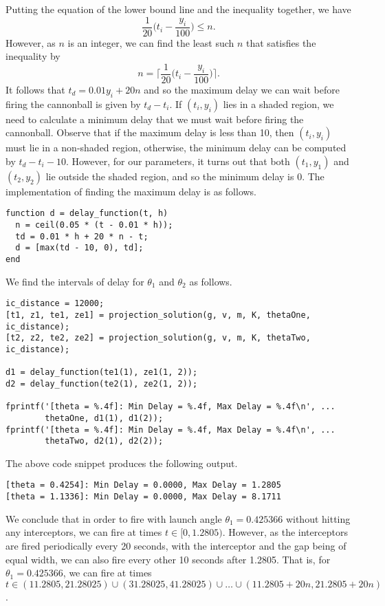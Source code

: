 \noindent
Putting the equation of the lower bound line and the inequality together, we have
$$\frac{1}{20}\Bigg(t_i - \frac{y_i}{100}\Bigg) \leq n.$$
However, as $n$ is an integer, we can find the least such $n$ that satisfies the inequality by 
$$n = \Bigg\lceil \frac{1}{20}\Bigg(t_i - \frac{y_i}{100}\Bigg) \Bigg\rceil.$$
It follows that $t_d = 0.01 y_i + 20n$ and so the maximum delay we can wait before firing the cannonball is given by $t_d - t_i$. If $(t_i, y_i)$ lies in a shaded region, we need to calculate a minimum delay that we must wait before firing the cannonball. Observe that if the maximum delay is less than 10, then $(t_i, y_i)$ must lie in a non-shaded region, otherwise, the minimum delay can be computed by $t_d - t_i - 10$. However, for our parameters, it turns out that both $(t_1, y_1)$ and $(t_2, y_2)$ lie outside the shaded region, and so the minimum delay is 0. The implementation of finding the maximum delay is as follows.

\begin{lstlisting}
function d = delay_function(t, h)
  n = ceil(0.05 * (t - 0.01 * h));
  td = 0.01 * h + 20 * n - t;
  d = [max(td - 10, 0), td];
end
\end{lstlisting}

\newpage
\noindent
We find the intervals of delay for $\theta_1$ and $\theta_2$ as follows.
\begin{lstlisting}
ic_distance = 12000;
[t1, z1, te1, ze1] = projection_solution(g, v, m, K, thetaOne, ic_distance);
[t2, z2, te2, ze2] = projection_solution(g, v, m, K, thetaTwo, ic_distance);
      
d1 = delay_function(te1(1), ze1(1, 2));
d2 = delay_function(te2(1), ze2(1, 2));
      
fprintf('[theta = %.4f]: Min Delay = %.4f, Max Delay = %.4f\n', ...
        thetaOne, d1(1), d1(2));
fprintf('[theta = %.4f]: Min Delay = %.4f, Max Delay = %.4f\n', ...
        thetaTwo, d2(1), d2(2));
\end{lstlisting}

\noindent
The above code snippet produces the following output.
\begin{lstlisting}
[theta = 0.4254]: Min Delay = 0.0000, Max Delay = 1.2805
[theta = 1.1336]: Min Delay = 0.0000, Max Delay = 8.1711
\end{lstlisting}

\noindent
We conclude that in order to fire with launch angle $\theta_1 = 0.425366$ without hitting any interceptors, we can fire at times $t \in [0, 1.2805)$. However, as the interceptors are fired periodically every 20 seconds, with the interceptor and the gap being of equal width, we can also fire every other 10 seconds after 1.2805. That is, for $\theta_1 = 0.425366$, we can fire at times $t \in (11.2805, 21.28025) \cup (31.28025, 41.28025) \cup \dots \cup (11.2805 + 20n, 21.2805 + 20n)$. \\

